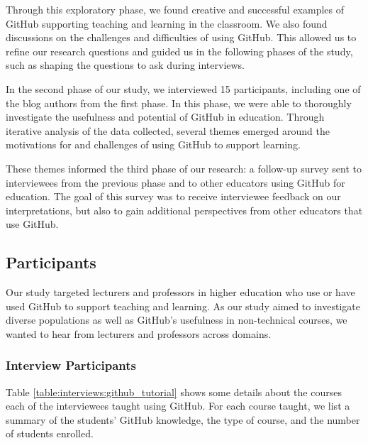 Through this exploratory phase, we found creative and successful examples of GitHub supporting teaching and learning in the classroom. We also found discussions on the challenges and difficulties of using GitHub. This allowed us to refine our research questions and guided us in the following phases of the study, such as shaping the questions to ask during interviews.

In the second phase of our study, we interviewed 15 participants, including one of the blog authors from the first phase. In this phase, we were able to thoroughly investigate the usefulness and potential of GitHub in education. Through iterative analysis of the data collected, several themes emerged around the motivations for and challenges of using GitHub to support learning.

These themes informed the third phase of our research: a follow-up survey sent to interviewees from the previous phase and to other educators using GitHub for education. The goal of this survey was to receive interviewee feedback on our interpretations, but also to gain additional perspectives from other educators that use GitHub.

\subsection{Participants}
Our study targeted lecturers and professors in higher education who use or have used GitHub to support teaching and learning. As our study aimed to investigate diverse populations as well as GitHub's usefulness in non-technical courses, we wanted to hear from lecturers and professors across domains.

\subsubsection{Interview Participants}
Table \ref{table:interviews:github_tutorial} shows some details about the courses each of the interviewees taught using GitHub. For each course taught, we list a summary of the students' GitHub knowledge, the type of course, and the number of students enrolled.

